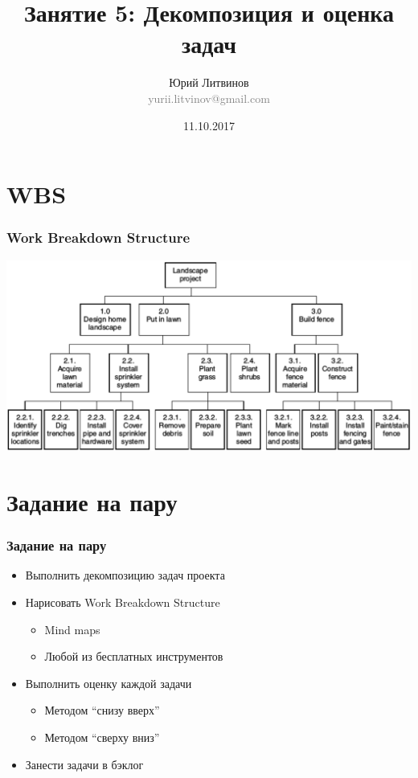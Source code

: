 \documentclass[xetex,mathserif,serif]{beamer}
\title{Занятие 5: Декомпозиция и оценка задач}
\author[Юрий Литвинов]{Юрий Литвинов\\\small{\textcolor{gray}{yurii.litvinov@gmail.com}}}
\date{11.10.2017}
\begin{document}
	\frame{\titlepage}

	\section{WBS}

	\begin{frame}
		\frametitle{Work Breakdown Structure}
		\begin{center}
			\includegraphics[width=\textwidth]{wbs.png}
		\end{center}
	\end{frame}

	\section{Задание на пару}

	\begin{frame}
		\frametitle{Задание на пару}
		\begin{itemize}
			\item Выполнить декомпозицию задач проекта
			\item Нарисовать Work Breakdown Structure
			\begin{itemize}
				\item Mind maps
				\item Любой из бесплатных инструментов
			\end{itemize}
			\item Выполнить оценку каждой задачи
			\begin{itemize}
				\item Методом ``снизу вверх''
				\item Методом ``сверху вниз''
			\end{itemize}
			\item Занести задачи в бэклог
		\end{itemize}
	\end{frame}
\end{document}
